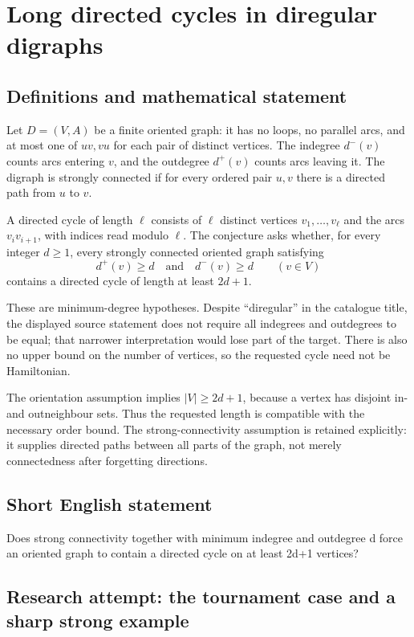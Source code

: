 \documentclass[11pt,a4paper]{article}
\begin{document}
\section*{Long directed cycles in diregular digraphs}\label{statement}

\subsection{Definitions and mathematical statement}
Let $D=(V,A)$ be a finite oriented graph: it has no loops, no parallel
arcs, and at most one of $uv,vu$ for each pair of distinct vertices.
The indegree $d^-(v)$ counts arcs entering $v$, and the outdegree $d^+(v)$
counts arcs leaving it. The digraph is strongly connected if for every
ordered pair $u,v$ there is a directed path from $u$ to $v$.

A directed cycle of length $\ell$ consists of $\ell$ distinct vertices
$v_1,\ldots,v_\ell$ and the arcs $v_iv_{i+1}$, with indices read modulo
$\ell$. The conjecture asks whether, for every integer $d\ge1$, every
strongly connected oriented graph satisfying
\[
                  d^+(v)\ge d\quad\text{and}\quad d^-(v)\ge d
                  \qquad(v\in V)
\]
contains a directed cycle of length at least $2d+1$.

These are minimum-degree hypotheses. Despite ``diregular'' in the
catalogue title, the displayed source statement does not require all
indegrees and outdegrees to be equal; that narrower interpretation
would lose part of the target. There is also no upper bound on the
number of vertices, so the requested cycle need not be Hamiltonian.

The orientation assumption implies $|V|\ge2d+1$, because a vertex has
disjoint in- and outneighbour sets. Thus the requested length is compatible
with the necessary order bound. The strong-connectivity assumption is
retained explicitly: it supplies directed paths between all parts of
the graph, not merely connectedness after forgetting directions.
\subsection{Short English statement}
Does strong connectivity together with minimum indegree and outdegree d force an oriented graph to contain a directed cycle on at least 2d+1 vertices?
\subsection{Research attempt: the tournament case and a sharp strong example}
\end{document}
